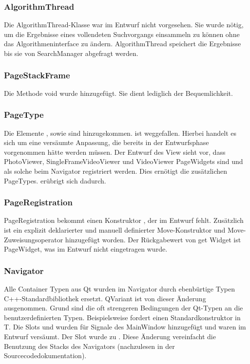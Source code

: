 \subsubsection{AlgorithmThread}
Die AlgorithmThread-Klasse war im Entwurf nicht vorgesehen. Sie wurde nötig, um die Ergebnisse eines vollendeten Suchvorgangs einsammeln zu können ohne das Algorithmeninterface zu ändern. AlgorithmThread speichert die Ergebnisse bis sie von SearchManager abgefragt werden.

\subsubsection{PageStackFrame}
Die Methode void  wurde hinzugefügt. Sie dient lediglich der Bequemlichkeit.

\subsubsection{PageType}
Die Elemente ,  sowie  sind hinzugekommen.  ist weggefallen. Hierbei handelt es sich um eine versäumte Anpassung, die bereits in der Entwurfsphase vorgenommen hätte werden müssen. Der Entwurf des View sieht vor, dass PhotoViewer, SingleFrameVideoViewer und VideoViewer PageWidgets sind und als solche beim Navigator registriert werden. Dies ernötigt die zusätzlichen PageTypes.  erübrigt sich dadurch.

\subsubsection{PageRegistration}
PageRegistration bekommt einen Konstruktor , der im Entwurf fehlt. Zusätzlich ist ein explizit deklarierter und manuell definierter Move-Konstruktor und Move-Zuweisungsoperator hinzugefügt worden. Der Rückgabewert von get Widget ist PageWidget, was im Entwurf nicht eingetragen wurde.

\subsubsection{Navigator}
Alle Container Typen aus Qt wurden im Navigator durch ebenbürtige Typen C++-Standardbibliothek ersetzt. QVariant ist von dieser Änderung ausgenommen. Grund sind die oft strengeren Bedingungen der Qt-Typen an die benutzerdefinierten Typen. Beispielsweise fordert  einen Standardkonstruktor in T.
Die Slots  und  wurden für Signale des MainWindow hinzugefügt und waren im Entwurf versäumt.
Der Slot  wurde zu . Diese Änderung vereinfacht die Benutzung des Stacks des Navigators (nachzulesen in der Sourcecodedokumentation).
